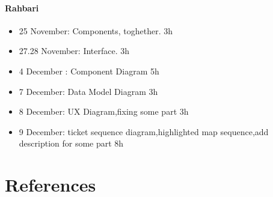 \documentclass{article}
\begin{document}
	\paragraph{Rahbari}
		\begin{itemize}
			\item 25 November: Components, toghether. 3h
			\item 27.28 November: Interface. 3h
			\item 4 December : Component Diagram 5h
			\item 7 December: Data Model Diagram 3h
			\item 8 December: UX Diagram,fixing some part 3h
			\item 9 December: ticket sequence diagram,highlighted map sequence,add description for some part 8h
		\end{itemize}
\section{References}
\end{document}
